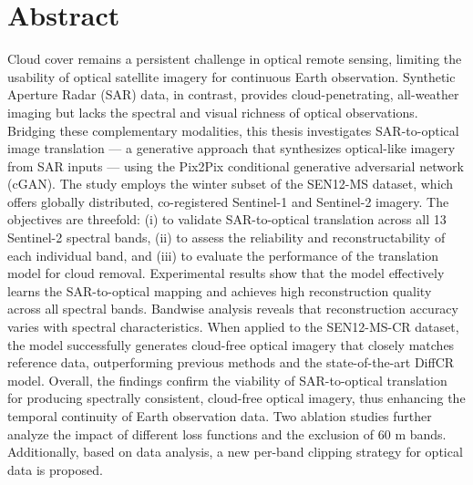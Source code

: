 \chapter*{Abstract}
Cloud cover remains a persistent challenge in optical remote sensing, limiting the usability of optical satellite imagery for continuous Earth observation. Synthetic Aperture Radar (SAR) data, in contrast, provides cloud-penetrating, all-weather imaging but lacks the spectral and visual richness of optical observations. Bridging these complementary modalities, this thesis investigates SAR-to-optical image translation — a generative approach that synthesizes optical-like imagery from SAR inputs — using the Pix2Pix conditional generative adversarial network (cGAN).
The study employs the winter subset of the SEN12-MS dataset, which offers globally distributed, co-registered Sentinel-1 and Sentinel-2 imagery. The objectives are threefold: (i) to validate SAR-to-optical translation across all 13 Sentinel-2 spectral bands, (ii) to assess the reliability and reconstructability of each individual band, and (iii) to evaluate the performance of the translation model for cloud removal.
Experimental results show that the model effectively learns the SAR-to-optical mapping and achieves high reconstruction quality across all spectral bands. Bandwise analysis reveals that reconstruction accuracy varies with spectral characteristics. When applied to the SEN12-MS-CR dataset, the model successfully generates cloud-free optical imagery that closely matches reference data, outperforming previous methods and the state-of-the-art DiffCR model.
Overall, the findings confirm the viability of SAR-to-optical translation for producing spectrally consistent, cloud-free optical imagery, thus enhancing the temporal continuity of Earth observation data. Two ablation studies further analyze the impact of different loss functions and the exclusion of 60 m bands. Additionally, based on data analysis, a new per-band clipping strategy for optical data is proposed.